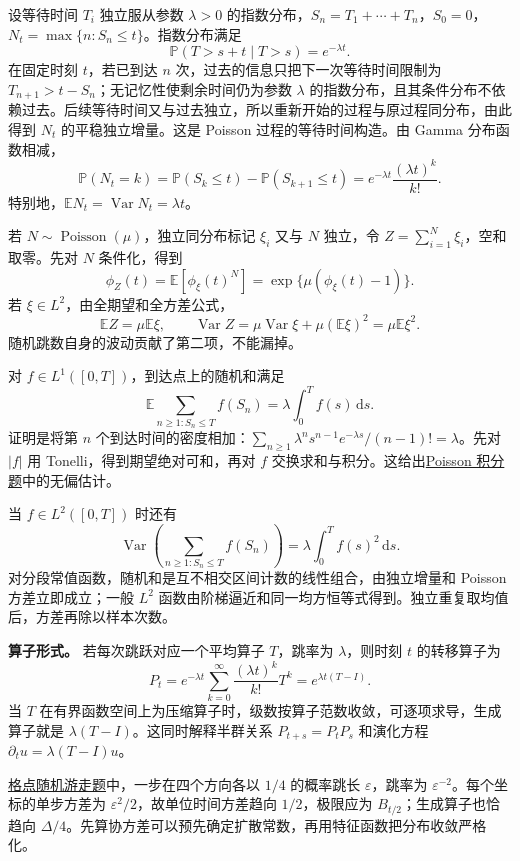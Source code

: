 设等待时间 $T_i$ 独立服从参数 $\lambda>0$ 的指数分布，$S_n=T_1+\cdots+T_n$，$S_0=0$，$N_t=\max\{n:S_n\le t\}$。指数分布满足
\[
\mathbb P(T>s+t\mid T>s)=e^{-\lambda t}.
\]
在固定时刻 $t$，若已到达 $n$ 次，过去的信息只把下一次等待时间限制为 $T_{n+1}>t-S_n$；无记忆性使剩余时间仍为参数 $\lambda$ 的指数分布，且其条件分布不依赖过去。后续等待时间又与过去独立，所以重新开始的过程与原过程同分布，由此得到 $N_t$ 的平稳独立增量。这是 Poisson 过程的等待时间构造。由 Gamma 分布函数相减，
\[
\mathbb P(N_t=k)=\mathbb P(S_k\le t)-\mathbb P(S_{k+1}\le t)
=e^{-\lambda t}\frac{(\lambda t)^k}{k!}.
\]
特别地，$\mathbb EN_t=\operatorname{Var}N_t=\lambda t$。

若 $N\sim\operatorname{Poisson}(\mu)$，独立同分布标记 $\xi_i$ 又与 $N$ 独立，令 $Z=\sum_{i=1}^N\xi_i$，空和取零。先对 $N$ 条件化，得到
\[
\phi_Z(t)=\mathbb E[\phi_\xi(t)^N]
=\exp\{\mu(\phi_\xi(t)-1)\}.
\]
若 $\xi\in L^2$，由全期望和全方差公式，
\[
\mathbb EZ=\mu\mathbb E\xi,\qquad
\operatorname{Var}Z=\mu\operatorname{Var}\xi+\mu(\mathbb E\xi)^2
=\mu\mathbb E\xi^2.
\]
随机跳数自身的波动贡献了第二项，不能漏掉。

对 $f\in L^1([0,T])$，到达点上的随机和满足
\[
\mathbb E\sum_{n\ge1:S_n\le T}f(S_n)=\lambda\int_0^Tf(s)\,\mathrm ds.
\]
证明是将第 $n$ 个到达时间的密度相加：$\sum_{n\ge1}\lambda^ns^{n-1}e^{-\lambda s}/(n-1)!=\lambda$。先对 $|f|$ 用 Tonelli，得到期望绝对可和，再对 $f$ 交换求和与积分。这给出\hyperref[pr:fin14-high:12]{Poisson 积分题}中的无偏估计。

当 $f\in L^2([0,T])$ 时还有
\[
\operatorname{Var}\!\left(\sum_{n\ge1:S_n\le T}f(S_n)\right)
=\lambda\int_0^Tf(s)^2\,\mathrm ds.
\]
对分段常值函数，随机和是互不相交区间计数的线性组合，由独立增量和 Poisson 方差立即成立；一般 $L^2$ 函数由阶梯逼近和同一均方恒等式得到。独立重复取均值后，方差再除以样本次数。

\textbf{算子形式。} 若每次跳跃对应一个平均算子 $T$，跳率为 $\lambda$，则时刻 $t$ 的转移算子为
\[
P_t=e^{-\lambda t}\sum_{k=0}^\infty\frac{(\lambda t)^k}{k!}T^k
=e^{\lambda t(T-I)}.
\]
当 $T$ 在有界函数空间上为压缩算子时，级数按算子范数收敛，可逐项求导，生成算子就是 $\lambda(T-I)$。这同时解释半群关系 $P_{t+s}=P_tP_s$ 和演化方程 $\partial_tu=\lambda(T-I)u$。

\hyperref[pr:fin15-high:12]{格点随机游走题}中，一步在四个方向各以 $1/4$ 的概率跳长 $\varepsilon$，跳率为 $\varepsilon^{-2}$。每个坐标的单步方差为 $\varepsilon^2/2$，故单位时间方差趋向 $1/2$，极限应为 $B_{t/2}$；生成算子也恰趋向 $\Delta/4$。先算协方差可以预先确定扩散常数，再用特征函数把分布收敛严格化。

